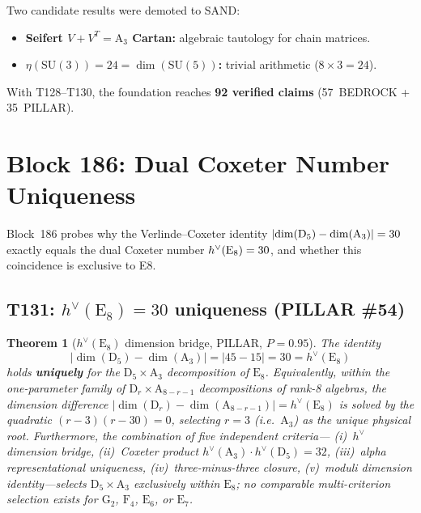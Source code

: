 \documentclass[aps,prd,twocolumn,superscriptaddress,floatfix,nofootinbib]{revtex4-2}
\newtheorem{theorem}{Theorem}
\theoremstyle{definition}
\theoremstyle{remark}
\begin{document}
Two candidate results were demoted to SAND:
\begin{itemize}
\item \textbf{Seifert $V + V^T = \mathrm{A}_3$ Cartan:} algebraic tautology for chain matrices.
\item \textbf{$\eta(\mathrm{SU}(3)) = 24 = \dim(\mathrm{SU}(5))$:} trivial arithmetic ($8 \times 3 = 24$).
\end{itemize}

\noindent
With T128--T130, the foundation reaches \textbf{92 verified claims} (57~BEDROCK + 35~PILLAR).

\section{Block 186: Dual Coxeter Number Uniqueness}
\label{sec:block186}

Block~186 probes why the Verlinde--Coxeter identity $|{\rm dim}({\rm D}_5) - {\rm dim}({\rm A}_3)|=30$
exactly equals the dual Coxeter number $h^\vee({\rm E}_8)=30$, and whether this coincidence
is exclusive to E8.

\subsection{T131: $h^\vee(\mathrm{E}_8){=}30$ uniqueness (PILLAR \#54)}
\label{sec:t131-hv-e8}

\begin{theorem}[$h^\vee(\mathrm{E}_8)$ dimension bridge, PILLAR, $P{=}0.95$]
\label{thm:t131}
The identity
\begin{equation}
|\dim(\mathrm{D}_5) - \dim(\mathrm{A}_3)| = |45 - 15| = 30 = h^\vee(\mathrm{E}_8)
\end{equation}
holds \textbf{uniquely} for the $\mathrm{D}_5 \times \mathrm{A}_3$ decomposition of $\mathrm{E}_8$.
Equivalently, within the one-parameter family of $\mathrm{D}_r \times \mathrm{A}_{8-r-1}$
decompositions of rank-8 algebras, the dimension difference
$|\dim(\mathrm{D}_r)-\dim(\mathrm{A}_{8-r-1})| = h^\vee(\mathrm{E}_8)$ is solved by the
quadratic $(r-3)(r-30)=0$, selecting $r=3$ (i.e.\ $\mathrm{A}_3$) as the unique physical root.
Furthermore, the combination of five independent criteria---
(i)~$h^\vee$ dimension bridge, (ii)~Coxeter product $h^\vee(\mathrm{A}_3)\cdot h^\vee(\mathrm{D}_5)=32$,
(iii)~alpha representational uniqueness, (iv)~three-minus-three closure,
(v)~moduli dimension identity---selects $\mathrm{D}_5\times\mathrm{A}_3$ exclusively
within $\mathrm{E}_8$; no comparable multi-criterion selection exists for
$\mathrm{G}_2$, $\mathrm{F}_4$, $\mathrm{E}_6$, or $\mathrm{E}_7$.
\end{theorem}
\end{document}
